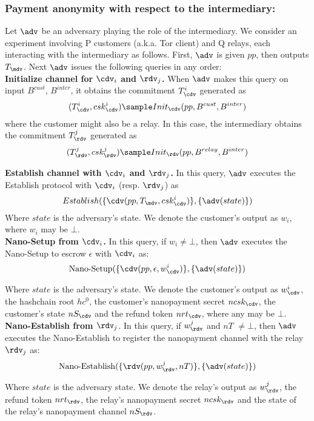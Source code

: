 \subsubsection{Payment anonymity with respect to the intermediary:}
\label{def:anon1}

Let $\adv$ be an adversary playing the role of the intermediary.
We consider an experiment involving P customers (a.k.a. Tor client) and Q relays, each interacting with the intermediary as follows.
First, $\adv$ is given $pp$, then outputs $T_\mdv$.
Next $\adv$ issues the following queries in any order:\\

\textbf{Initialize channel for $\cdv_i$ and $\rdv_j$.}
When $\adv$ makes this query on input $B^{cust}$, $B^{inter}$, it obtains the commitment $T^i_\cdv$ generated as $$(T^i_\cdv, csk^i_\cdv) \sample Init_\cdv(pp, B^{cust}, B^{inter})$$ where the customer might also be a relay.
In this case, the intermediary obtains the commitment $T^j_\rdv$ generated as $$(T^j_\rdv, csk^j_\rdv) \sample Init_\rdv(pp, B^{relay}, B^{inter})$$

\textbf{Establish channel with $\cdv_i$ and $\rdv_j$.}
In this query, $\adv$ executes the Establish protocol with $\cdv_i$ (resp.
$\rdv_j$) as $$Establish(\{\cdv(pp, T_\mdv, csk^i_\cdv)\},\{\adv(state)\})$$ Where $state$ is the adversary's state.
We denote the customer's output as $w_i$, where $w_i$ may be $\bot$.\\

\textbf{Nano-Setup from $\cdv_i$.}
In this query, if $w_i \neq \bot$, then $\adv$ executes the Nano-Setup to escrow $\epsilon$ with $\cdv_i$ as: $$\operatorname{Nano-Setup}(\{\cdv(pp, \epsilon, w^i_\cdv)\}, \{\adv(state)\})$$

Where $state$ is the adversary's state.
We denote the customer's output as $w^i_\cdv$, the hashchain root $hc^0$, the customer's nanopayment secret $ncsk_\cdv$, the customer's state $nS_\cdv$ and the refund token $nrt_\cdv$, where any may be $\bot$.\\

\textbf{Nano-Establish from $\rdv_j$}.
In this query, if $w^j_\rdv$ and $nT$ $\neq \bot$, then $\adv$ executes the Nano-Establish to register the nanopayment channel with the relay $\rdv_j$ as: $$\operatorname{Nano-Establish}(\{\rdv(pp, w^j_\rdv, nT)\}, \{\adv(state)\})$$

Where $state$ is the adversary state.
We denote the relay's output as $w^j_\rdv$, the refund token $nrt_\rdv$, the relay's nanopayment secret $ncsk_\rdv$ and the state of the relay's nanopayment channel $nS_\rdv$.
\\

